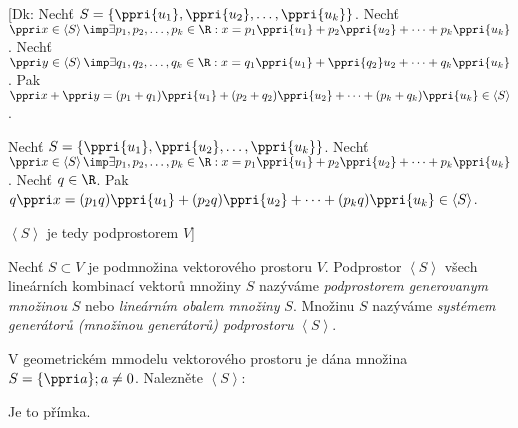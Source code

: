 [Dk: Nechť $S=\{\ppri{u_1},\ppri{u_2},\dots,\ppri{u_k}\}$.
Nechť $\ppri x \in \left< S \right> \imp \exists p_1,p_2,\dots,p_k \in \R : x=p_1\*\ppri{u_1}+p_2\*\ppri{u_2} + \cdots+ p_k\*\ppri{u_k}$.
Nechť $\ppri y \in \left< S \right> \imp \exists q_1,q_2,\dots,q_k \in \R : x=q_1\*\ppri{u_1}+\ppri{q_2}\*u_2 + \cdots+ q_k\*\ppri{u_k}$.
Pak $\ppri x + \ppri y = (p_1+q_1)\*\ppri{u_1} + (p_2+q_2)\*\ppri{u_2} + \dots+(p_k+q_k)\*\ppri{u_k} \in \left< S \right>$. 

Nechť $S=\{\ppri{u_1},\ppri{u_2},\dots,\ppri{u_k}\}$.
Nechť $\ppri x \in \left< S \right> \imp \exists p_1,p_2,\dots,p_k \in \R : x=p_1\*\ppri{u_1}+p_2\*\ppri{u_2} + \cdots+ p_k\*\ppri{u_k}$.
Nechť $q \in \R$.
Pak $q\* \ppri x = (p_1\*q)\*\ppri{u_1} + (p_2\*q)\*\ppri{u_2} + \dots+(p_k\*q)\*\ppri{u_k} \in \left< S \right>$.

$\left<S\right>$ je tedy podprostorem $V$]

\Def Nechť $S\subset V$ je podmnožina vektorového prostoru $V$.
Podprostor $\left<S\right>$ všech lineárních kombinací vektorů množiny $S$ nazýváme \emph{podprostorem generovanym množinou} $S$ nebo \emph{lineárním obalem množiny} $S$.
Množinu $S$ nazýváme \emph{systémem generátorů (množinou generátorů) podprostoru} $\left<S\right>$.

\Pr V geometrickém mmodelu vektorového prostoru je dána množina $S=\{\ppri a\}; a\neq 0$. Nalezněte $\left< S \right>$:

Je to přímka.


\EndDoc

